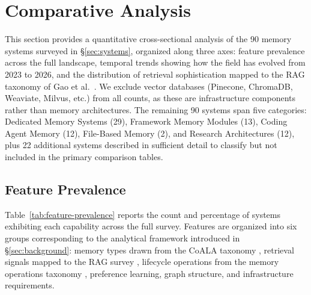 \section{Comparative Analysis}
\label{sec:comparison}

This section provides a quantitative cross-sectional analysis of the 90 memory
systems surveyed in \S\ref{sec:systems}, organized along three axes: feature
prevalence across the full landscape, temporal trends showing how the field has
evolved from 2023 to 2026, and the distribution of retrieval sophistication
mapped to the RAG taxonomy of Gao et al.~\cite{gao2023rag}. We exclude vector
databases (Pinecone, ChromaDB, Weaviate, Milvus, etc.) from all counts, as
these are infrastructure components rather than memory architectures. The
remaining 90 systems span five categories: Dedicated Memory Systems (29),
Framework Memory Modules (13), Coding Agent Memory (12), File-Based Memory (2),
and Research Architectures (12), plus 22 additional systems described in
sufficient detail to classify but not included in the primary comparison
tables.

\subsection{Feature Prevalence}
\label{sec:feature-prevalence}

Table~\ref{tab:feature-prevalence} reports the count and percentage of systems
exhibiting each capability across the full survey. Features are organized into
six groups corresponding to the analytical framework introduced in
\S\ref{sec:background}: memory types drawn from the CoALA taxonomy
\cite{sumers2024coala}, retrieval signals mapped to the RAG survey
\cite{gao2023rag}, lifecycle operations from the memory operations taxonomy
\cite{zhang2024survey}, preference learning, graph structure, and
infrastructure requirements.


